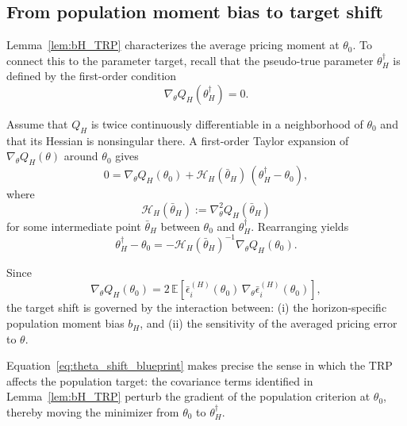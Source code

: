 \subsection{From population moment bias to target shift}
\label{sec:appendix_bv_target_shift}

Lemma~\ref{lem:bH_TRP} characterizes the average pricing moment at $\theta_0$.
To connect this to the parameter target, recall that the pseudo-true parameter $\theta_H^\dagger$ is defined by the first-order condition
\begin{equation}
	\label{eq:FOC_QH_blueprint}
	\nabla_\theta Q_H(\theta_H^\dagger) = 0.
\end{equation}

Assume that $Q_H$ is twice continuously differentiable in a neighborhood of $\theta_0$ and that its Hessian is nonsingular there.
A first-order Taylor expansion of $\nabla_\theta Q_H(\theta)$ around $\theta_0$ gives
\begin{equation}
	\label{eq:FOC_taylor_blueprint}
	0
	=
	\nabla_\theta Q_H(\theta_0)
	+
	\mathcal{H}_H(\bar{\theta}_H)\,
	(\theta_H^\dagger - \theta_0),
\end{equation}
where
\[
\mathcal{H}_H(\bar{\theta}_H)
:=
\nabla_\theta^2 Q_H(\bar{\theta}_H)
\]
for some intermediate point $\bar{\theta}_H$ between $\theta_0$ and $\theta_H^\dagger$.
Rearranging yields
\begin{equation}
	\label{eq:theta_shift_blueprint}
	\theta_H^\dagger - \theta_0
	=
	-
	\mathcal{H}_H(\bar{\theta}_H)^{-1}
	\nabla_\theta Q_H(\theta_0).
\end{equation}

Since
\begin{equation}
	\label{eq:grad_QH_blueprint}
	\nabla_\theta Q_H(\theta_0)
	=
	2\,
	\mathbb{E}\!\left[
	\bar{\epsilon}_i^{(H)}(\theta_0)\,
	\nabla_\theta \bar{\epsilon}_i^{(H)}(\theta_0)
	\right],
\end{equation}
the target shift is governed by the interaction between:
(i) the horizon-specific population moment bias $b_H$, and
(ii) the sensitivity of the averaged pricing error to $\theta$.

Equation~\ref{eq:theta_shift_blueprint} makes precise the sense in which the TRP affects the population target:
the covariance terms identified in Lemma~\ref{lem:bH_TRP} perturb the gradient of the population criterion at $\theta_0$, thereby moving the minimizer from $\theta_0$ to $\theta_H^\dagger$.

